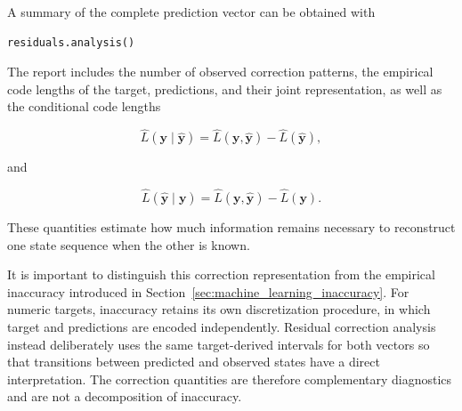 A summary of the complete prediction vector can be obtained with

\begin{sourcecode}
{\scriptsize
\begin{verbatim}
residuals.analysis()
\end{verbatim}}
\end{sourcecode}

The report includes the number of observed correction patterns, the empirical
code lengths of the target, predictions, and their joint representation, as well
as the conditional code lengths

\[
\widehat L(\mathbf y\mid\widehat{\mathbf y})
=
\widehat L(\mathbf y,\widehat{\mathbf y})
-
\widehat L(\widehat{\mathbf y}),
\]

and

\[
\widehat L(\widehat{\mathbf y}\mid\mathbf y)
=
\widehat L(\mathbf y,\widehat{\mathbf y})
-
\widehat L(\mathbf y).
\]

These quantities estimate how much information remains necessary to reconstruct
one state sequence when the other is known.

It is important to distinguish this correction representation from the empirical
inaccuracy introduced in Section~\ref{sec:machine_learning_inaccuracy}.
For numeric targets, inaccuracy retains its own discretization procedure, in
which target and predictions are encoded independently. Residual correction
analysis instead deliberately uses the same target-derived intervals for both
vectors so that transitions between predicted and observed states have a direct
interpretation. The correction quantities are therefore complementary
diagnostics and are not a decomposition of inaccuracy.

